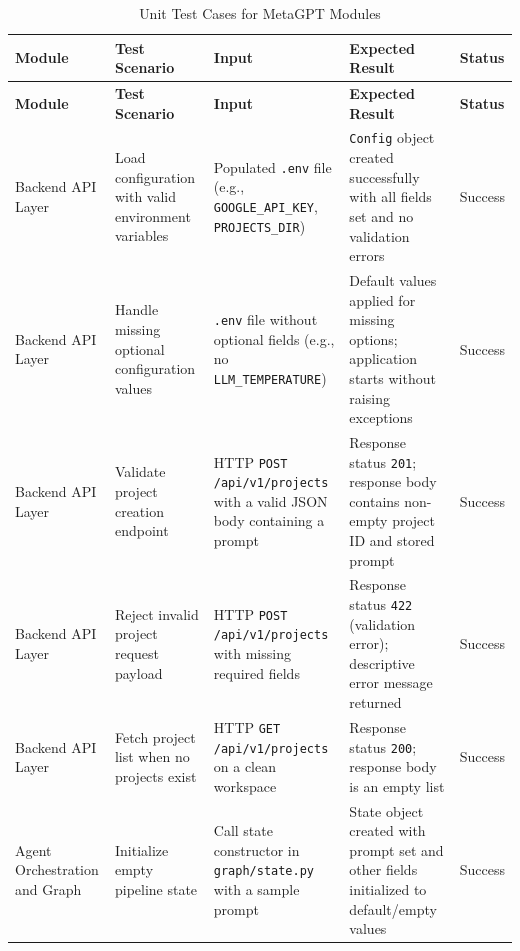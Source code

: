 \renewcommand{\arraystretch}{1.3}
\begingroup
\setlength{\LTleft}{-1.5cm}
\begin{longtable}{|p{3.0cm}|p{3.8cm}|p{3.8cm}|p{4.6cm}|>{\centering\arraybackslash}p{1.8cm}|}
\caption{Unit Test Cases for MetaGPT Modules}
\label{tab:unit_tests}
\\
\hline
\textbf{Module} & \textbf{Test Scenario} & \textbf{Input} & \textbf{Expected Result} & \textbf{Status} \\
\hline
\endfirsthead
\hline
\textbf{Module} & \textbf{Test Scenario} & \textbf{Input} & \textbf{Expected Result} & \textbf{Status} \\
\hline
\endhead
\hline
\endfoot
\hline
\endlastfoot
Backend API Layer & Load configuration with valid environment variables & Populated \texttt{.env} file (e.g., \texttt{GOOGLE\_\allowbreak{}API\_\allowbreak{}KEY}, \texttt{PROJECTS\_\allowbreak{}DIR}) & \texttt{Config} object created successfully with all fields set and no validation errors & Success \\
\hline
Backend API Layer & Handle missing optional configuration values & \texttt{.env} file without optional fields (e.g., no \texttt{LLM\_\allowbreak{}TEMPERATURE}) & Default values applied for missing options; application starts without raising exceptions & Success \\
\hline
Backend API Layer & Validate project creation endpoint & HTTP \texttt{POST} \texttt{/\allowbreak{}api/\allowbreak{}v1/\allowbreak{}projects} with a valid JSON body containing a prompt & Response status \texttt{201}; response body contains non-empty project ID and stored prompt & Success \\
\hline
Backend API Layer & Reject invalid project request payload & HTTP \texttt{POST} \texttt{/\allowbreak{}api/\allowbreak{}v1/\allowbreak{}projects} with missing required fields & Response status \texttt{422} (validation error); descriptive error message returned & Success \\
\hline
Backend API Layer & Fetch project list when no projects exist & HTTP \texttt{GET} \texttt{/\allowbreak{}api/\allowbreak{}v1/\allowbreak{}projects} on a clean workspace & Response status \texttt{200}; response body is an empty list & Success \\
\hline
Agent Orchestration and Graph & Initialize empty pipeline state & Call state constructor in \texttt{graph/\allowbreak{}state.py} with a sample prompt & State object created with prompt set and other fields initialized to default/empty values & Success \\

\end{longtable}
